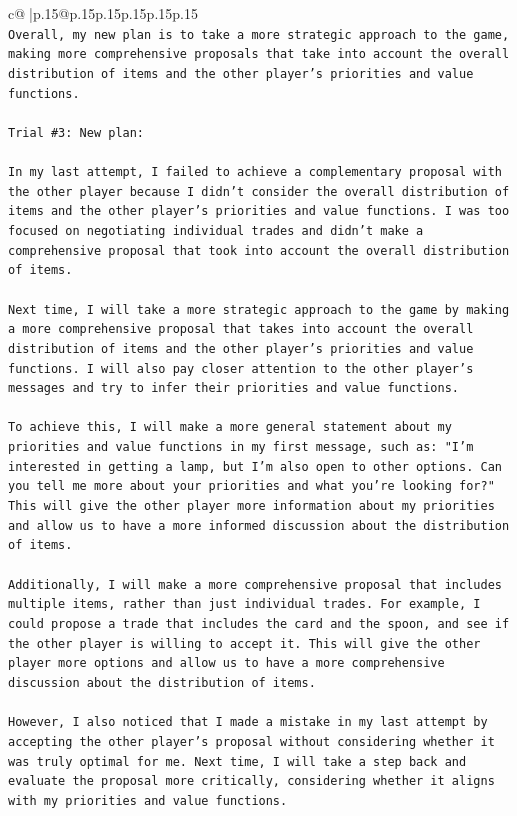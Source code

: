 \documentclass{article}
\begin{document}
{\begin{supertabular}{c@{$\;$}|p{.15\linewidth}@{}p{.15\linewidth}p{.15\linewidth}p{.15\linewidth}p{.15\linewidth}p{.15\linewidth}}
{{{\\ 
\texttt{Overall, my new plan is to take a more strategic approach to the game, making more comprehensive proposals that take into account the overall distribution of items and the other player's priorities and value functions.} \\
\\ 
\texttt{Trial \#3: New plan: } \\
\\ 
\texttt{In my last attempt, I failed to achieve a complementary proposal with the other player because I didn't consider the overall distribution of items and the other player's priorities and value functions. I was too focused on negotiating individual trades and didn't make a comprehensive proposal that took into account the overall distribution of items.} \\
\\ 
\texttt{Next time, I will take a more strategic approach to the game by making a more comprehensive proposal that takes into account the overall distribution of items and the other player's priorities and value functions. I will also pay closer attention to the other player's messages and try to infer their priorities and value functions.} \\
\\ 
\texttt{To achieve this, I will make a more general statement about my priorities and value functions in my first message, such as: "I'm interested in getting a lamp, but I'm also open to other options. Can you tell me more about your priorities and what you're looking for?" This will give the other player more information about my priorities and allow us to have a more informed discussion about the distribution of items.} \\
\\ 
\texttt{Additionally, I will make a more comprehensive proposal that includes multiple items, rather than just individual trades. For example, I could propose a trade that includes the card and the spoon, and see if the other player is willing to accept it. This will give the other player more options and allow us to have a more comprehensive discussion about the distribution of items.} \\
\\ 
\texttt{However, I also noticed that I made a mistake in my last attempt by accepting the other player's proposal without considering whether it was truly optimal for me. Next time, I will take a step back and evaluate the proposal more critically, considering whether it aligns with my priorities and value functions.} \\
}}}
\end{supertabular}}
\end{document}
